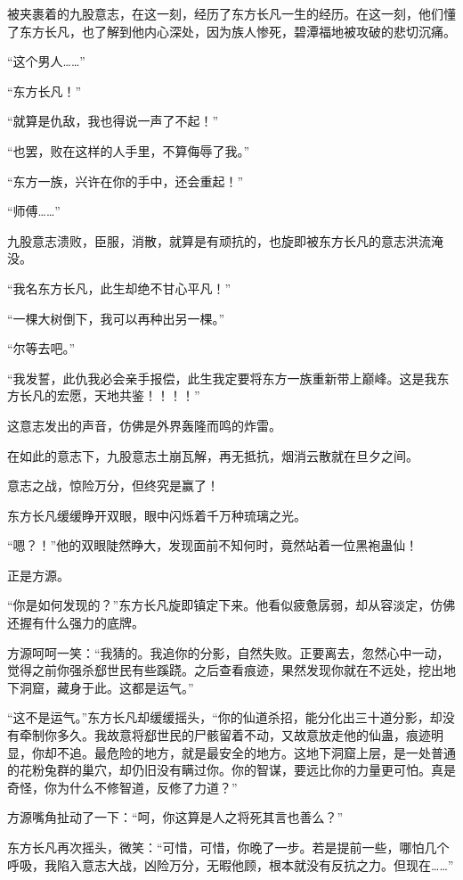 \begin{this_body}
被夹裹着的九股意志，在这一刻，经历了东方长凡一生的经历。在这一刻，他们懂了东方长凡，也了解到他内心深处，因为族人惨死，碧潭福地被攻破的悲切沉痛。

“这个男人……”

“东方长凡！”

“就算是仇敌，我也得说一声了不起！”

“也罢，败在这样的人手里，不算侮辱了我。”

“东方一族，兴许在你的手中，还会重起！”

“师傅……”

九股意志溃败，臣服，消散，就算是有顽抗的，也旋即被东方长凡的意志洪流淹没。

“我名东方长凡，此生却绝不甘心平凡！”

“一棵大树倒下，我可以再种出另一棵。”

“尔等去吧。”

“我发誓，此仇我必会亲手报偿，此生我定要将东方一族重新带上巅峰。这是我东方长凡的宏愿，天地共鉴！！！！”

这意志发出的声音，仿佛是外界轰隆而鸣的炸雷。

在如此的意志下，九股意志土崩瓦解，再无抵抗，烟消云散就在旦夕之间。

意志之战，惊险万分，但终究是赢了！

东方长凡缓缓睁开双眼，眼中闪烁着千万种琉璃之光。

“嗯？！”他的双眼陡然睁大，发现面前不知何时，竟然站着一位黑袍蛊仙！

正是方源。

“你是如何发现的？”东方长凡旋即镇定下来。他看似疲惫孱弱，却从容淡定，仿佛还握有什么强力的底牌。

方源呵呵一笑：“我猜的。我追你的分影，自然失败。正要离去，忽然心中一动，觉得之前你强杀郄世民有些蹊跷。之后查看痕迹，果然发现你就在不远处，挖出地下洞窟，藏身于此。这都是运气。”

“这不是运气。”东方长凡却缓缓摇头，“你的仙道杀招，能分化出三十道分影，却没有牵制你多久。我故意将郄世民的尸骸留着不动，又故意放走他的仙蛊，痕迹明显，你却不追。最危险的地方，就是最安全的地方。这地下洞窟上层，是一处普通的花粉兔群的巢穴，却仍旧没有瞒过你。你的智谋，要远比你的力量更可怕。真是奇怪，你为什么不修智道，反修了力道？”

方源嘴角扯动了一下：“呵，你这算是人之将死其言也善么？”

东方长凡再次摇头，微笑：“可惜，可惜，你晚了一步。若是提前一些，哪怕几个呼吸，我陷入意志大战，凶险万分，无暇他顾，根本就没有反抗之力。但现在……”


\end{this_body}

